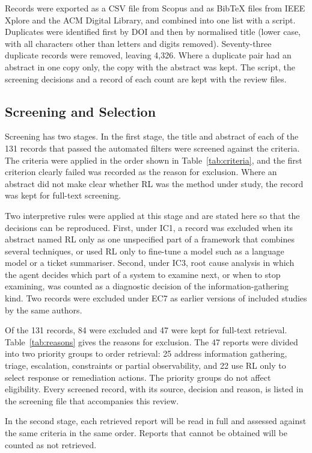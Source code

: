 \documentclass[journal]{IEEEtran}
\begin{document}
Records were exported as a CSV file from Scopus and as BibTeX files from IEEE Xplore and the ACM Digital Library, and combined into one list with a script. Duplicates were identified first by DOI and then by normalised title (lower case, with all characters other than letters and digits removed). Seventy-three duplicate records were removed, leaving 4,326. Where a duplicate pair had an abstract in one copy only, the copy with the abstract was kept. The script, the screening decisions and a record of each count are kept with the review files.

\subsection{Screening and Selection}
\label{sec:screening}

Screening has two stages. In the first stage, the title and abstract of each of the 131 records that passed the automated filters were screened against the criteria. The criteria were applied in the order shown in Table~\ref{tab:criteria}, and the first criterion clearly failed was recorded as the reason for exclusion. Where an abstract did not make clear whether RL was the method under study, the record was kept for full-text screening.

Two interpretive rules were applied at this stage and are stated here so that the decisions can be reproduced. First, under IC1, a record was excluded when its abstract named RL only as one unspecified part of a framework that combines several techniques, or used RL only to fine-tune a model such as a language model or a ticket summariser. Second, under IC3, root cause analysis in which the agent decides which part of a system to examine next, or when to stop examining, was counted as a diagnostic decision of the information-gathering kind. Two records were excluded under EC7 as earlier versions of included studies by the same authors.

Of the 131 records, 84 were excluded and 47 were kept for full-text retrieval. Table~\ref{tab:reasons} gives the reasons for exclusion. The 47 reports were divided into two priority groups to order retrieval: 25 address information gathering, triage, escalation, constraints or partial observability, and 22 use RL only to select response or remediation actions. The priority groups do not affect eligibility. Every screened record, with its source, decision and reason, is listed in the screening file that accompanies this review.

In the second stage, each retrieved report will be read in full and assessed against the same criteria in the same order. Reports that cannot be obtained will be counted as not retrieved.
\end{document}
